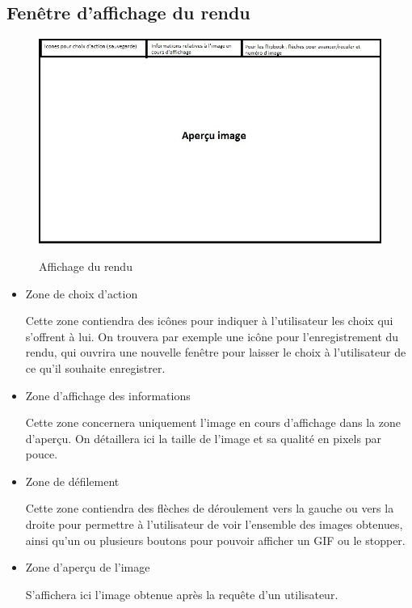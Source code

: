 \subsection{Fenêtre d'affichage du rendu}

\begin{figure}[H]
  \centering
  \includegraphics[scale=0.7]{apercuimage}
  \label{fig:apercu}
  \caption{Affichage du rendu}
\end{figure}

\begin{itemize}
\item Zone de choix d’action
  
  Cette zone contiendra des icônes pour indiquer à l’utilisateur les choix qui s’offrent à lui. On trouvera par exemple une icône pour l’enregistrement du rendu, qui ouvrira une nouvelle fenêtre pour laisser le choix à l’utilisateur de ce qu’il souhaite enregistrer.
  
\item Zone d’affichage des informations
  
  Cette zone concernera uniquement l’image en cours d’affichage dans la zone d’aperçu. On détaillera ici la taille de l’image et sa qualité en pixels par pouce.
  
\item Zone de défilement
  
  Cette zone contiendra des flèches de déroulement vers la gauche ou vers la droite pour permettre à l’utilisateur de voir l’ensemble des images obtenues, ainsi qu’un ou plusieurs boutons pour pouvoir afficher un GIF ou le stopper.
  
\item Zone d’aperçu de l’image
  
  S’affichera ici l’image obtenue après la requête d’un utilisateur.
  
\end{itemize}


